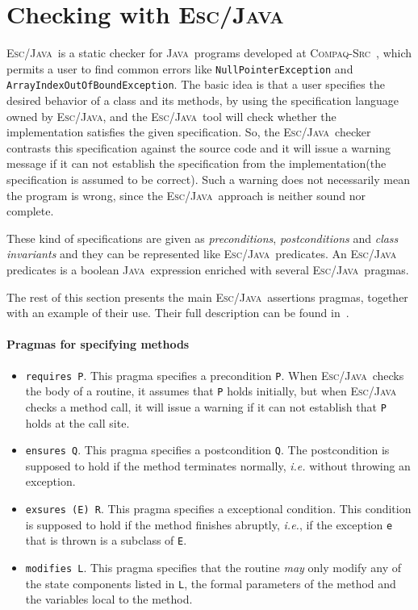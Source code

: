 \documentclass[a4paper]{llncs}
\newcommand{\escj}{\textsc{Esc/Java}}
\newcommand{\java}{\textsc{Java}}
\newcommand{\csrc}{\textsc{Compaq-Src}}
\begin{document}
\section{Checking with \escj}
\label{sec-esc-prg}

\escj~is a static checker for \java~programs developed
at \csrc~\cite{ESC}, which permits  
a user to find common errors like
\texttt{NullPointerException} and
\texttt{ArrayIndexOutOfBoundException}. The basic idea is that
a user specifies the desired behavior of a class and its methods, by
using the specification language owned by \escj, and 
the \escj~tool will check whether the implementation satisfies the given
specification. So, the \escj~checker contrasts this
specification against the source code and it will issue a warning 
message if it can not establish the specification from the
implementation(the specification is assumed to be correct). Such a
warning does not necessarily mean the program is
wrong, since the \escj~approach is neither sound nor complete.
 
These kind of specifications are given as
\textit{preconditions}, \textit{postconditions} and \textit{class 
invariants} and they can be represented like \escj ~predicates. An
\escj~ predicates is a boolean \java~expression
enriched with several \escj~pragmas.

The rest of this section presents the main \escj~assertions pragmas,
together with an example of their use. Their full description can be
found in~\cite{LeinoNS00}. 




\paragraph{\bf Pragmas for specifying methods} 
\begin{itemize} 
\item{\texttt{requires P}.} 
This pragma specifies a precondition {\tt P}. 
When \escj~checks the body of a
routine, it assumes that \texttt{P} holds initially, but when \escj~
checks a method call, it will issue a warning if 
it can not establish that \texttt{P} holds at the call site. 
 
\item{\texttt{ensures Q}.} 
This pragma specifies a postcondition \texttt{Q}. The postcondition  
is supposed to hold if the method terminates normally, \emph{i.e.}
without throwing an exception.
 
\item{\texttt{exsures (E) R}.} 
This pragma specifies a exceptional condition. This condition is 
supposed to hold if the method finishes abruptly, \emph{i.e.}, if
the exception \texttt{e} that is thrown is a subclass of \texttt{E}. 
 
\item{\texttt{modifies L}.} 
This pragma specifies that the routine \emph{may} only modify any of 
the state components listed in \texttt{L}, the formal parameters of 
the method and the variables local to the method. 
\end{itemize} 
 
\end{document}
